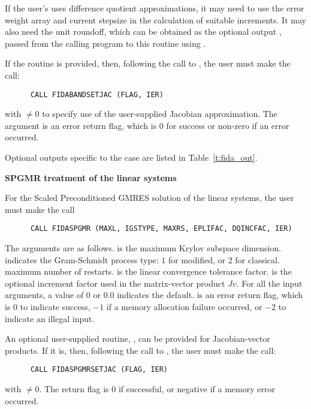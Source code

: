 \begin{Steps}
  If the user's  uses difference quotient approximations, it
  may need to use the error weight array  and current stepsize 
  in the calculation of suitable increments.  It may also need the unit
  roundoff, which can be obtained as the optional output ,
  passed from the calling program to this routine using .

  If the  routine is provided, then, following the call to
  , the user must make the call:
\begin{verbatim}
      CALL FIDABANDSETJAC (FLAG, IER)
\end{verbatim}
  with  $\neq 0$ to specify use of the user-supplied Jacobian
  approximation.  The argument  is an error return flag, which is $0$ 
  for success or non-zero if an error occurred.
  
  Optional outputs specific to the {\band} case are listed in
  Table~\ref{t:fida_out}.


  {\s}{\p} {\bf SPGMR treatment of the linear systems}
  
  For the Scaled Preconditioned GMRES solution of the linear systems,
  the user must make the call
\begin{verbatim}
      CALL FIDASPGMR (MAXL, IGSTYPE, MAXRS, EPLIFAC, DQINCFAC, IER)
\end{verbatim}
  The arguments are as follows.
   is the maximum Krylov subspace dimension.
   indicates the Gram-Schmidt process type: $1$ for modified,
   or $2$ for classical.
   maximum number of restarts.
   is the linear convergence tolerance factor.
   is the optional increment factor used in the matrix-vector product
  $Jv$.
  For all the input arguments, a value of 0 or $0.0$ indicates the default.
   is an error return flag, which is $0$ to indicate success, $-1$
  if a memory allocation failure occurred, or $-2$ to indicate an illegal input.
  
  An optional user-supplied routine, , can be provided for
  Jacobian-vector products.  If it is, then, following the call to
  , the user must make the call:
\begin{verbatim}
      CALL FIDASPGMRSETJAC (FLAG, IER)
\end{verbatim}
  with  $\neq 0$.  The return flag  is 0 if successful,
  or negative if a memory error occurred.
  

\end{Steps}
